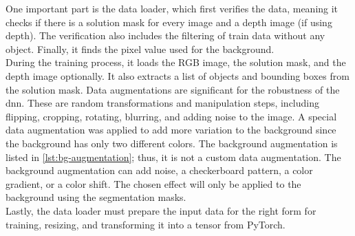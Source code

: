 		One important part is the data loader, which first verifies the data, meaning it checks if there is a solution mask for every image and a depth image (if using depth). The verification also includes the filtering of train data without any object. Finally, it finds the pixel value used for the background.\\
		During the training process, it loads the RGB image, the solution mask, and the depth image optionally. It also extracts a list of objects and bounding boxes from the solution mask. Data augmentations are significant for the robustness of the \ac{dnn}. These are random transformations and manipulation steps, including flipping, cropping, rotating, blurring, and adding noise to the image. A special data augmentation was applied to add more variation to the background since the background has only two different colors. The background augmentation is listed in \ref{lst:bg-augmentation}; thus, it is not a custom data augmentation. The background augmentation can add noise, a checkerboard pattern, a color gradient, or a color shift. The chosen effect will only be applied to the background using the segmentation masks. \\
		Lastly, the data loader must prepare the input data for the right form for training, resizing, and transforming it into a tensor from PyTorch.
		
